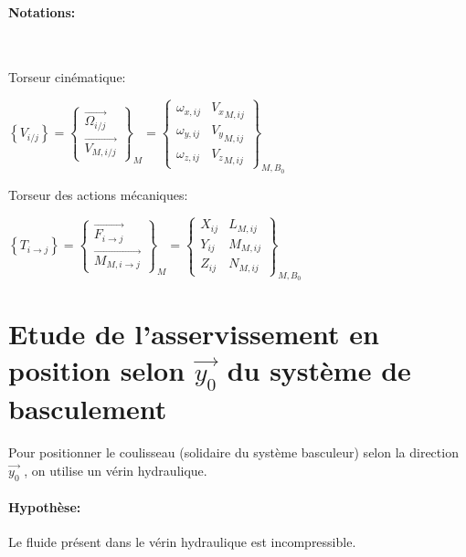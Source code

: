 \paragraph{Notations:} ~\ \\
\begin{minipage}[t]{0.45\linewidth}
Torseur cinématique:

$\left \{V_{i/ j}\right \}=\left\{
\begin{matrix}
 \overrightarrow {\Omega _{i/ j}} \\ 
 \overrightarrow {V_{M,i/j}} 
\end{matrix}
\right\}_{M}=\left\{
\begin{matrix}
 \omega_{x,ij} & {V_x }_{M,ij} \\
 \omega_{y,ij} & {V_y }_{M,ij} \\
 \omega_{z,ij} & {V_z}_{M,ij} 
\end{matrix}
\right\}_{M,B_0}$
\end{minipage}\hfill
\begin{minipage}[t]{0.45\linewidth}
Torseur des actions mécaniques:

$\left \{T_{i\rightarrow j}\right \}=\left\{
\begin{matrix}
 \overrightarrow {F_{i\rightarrow j}} \\ 
 \overrightarrow {M_{M,i\rightarrow j}} 
\end{matrix}
\right\}_{M}=\left \{
\begin{matrix}
 X_{ij} & {L }_{M,ij} \\
 Y_{ij} & {M }_{M,ij} \\
 Z_{ij} & {N }_{M,ij} 
\end{matrix}
\right \}_{M,B_0}$
\end{minipage}


\section{Etude de l'asservissement en position selon $\vec{y_0}$ du système de basculement}

Pour positionner le coulisseau (solidaire du système basculeur) selon la direction $\overrightarrow{y_0}$ , on utilise un vérin hydraulique.


\paragraph{Hypothèse:} Le fluide présent dans le vérin hydraulique est incompressible.


